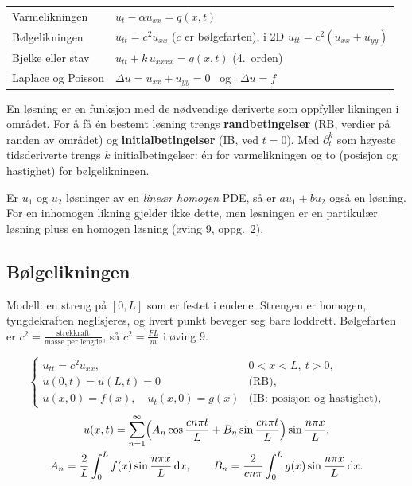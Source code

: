 \begin{defn}
\begin{tabular}{@{}ll@{}}
Varmelikningen & $u_t-\alpha u_{xx}=q(x,t)$\\
Bølgelikningen & $u_{tt}=c^2u_{xx}$ ($c$ er bølgefarten), i 2D $u_{tt}=c^2(u_{xx}+u_{yy})$\\
Bjelke eller stav & $u_{tt}+k\,u_{xxxx}=q(x,t)$ (4.\ orden)\\
Laplace og Poisson & $\Delta u=u_{xx}+u_{yy}=0$ \ og \ $\Delta u=f$
\end{tabular}
\end{defn}

\begin{defn}
En løsning er en funksjon med de nødvendige deriverte som oppfyller likningen i området. For å få én bestemt løsning trengs \textbf{randbetingelser} (RB, verdier på randen av området) og \textbf{initialbetingelser} (IB, ved $t=0$). Med $\partial_t^k$ som høyeste tidsderiverte trengs $k$ initialbetingelser: én for varmelikningen og to (posisjon og hastighet) for bølgelikningen.
\end{defn}
\begin{teorem}[superposisjonsprinsippet]
Er $u_1$ og $u_2$ løsninger av en \emph{lineær homogen} PDE, så er $au_1+bu_2$ også en løsning. For en inhomogen likning gjelder ikke dette, men løsningen er en partikulær løsning pluss en homogen løsning (øving 9, oppg.~2).
\end{teorem}

\subsection{Bølgelikningen}
Modell: en streng på $[0,L]$ som er festet i endene. Strengen er homogen, tyngdekraften neglisjeres, og hvert punkt beveger seg bare loddrett. Bølgefarten er $c^2=\frac{\text{strekkraft}}{\text{masse per lengde}}$, så $c^2=\frac{FL}m$ i øving 9.

\begin{formel}
\[
\begin{cases}
u_{tt}=c^2u_{xx}, & 0<x<L,\ t>0,\\
u(0,t)=u(L,t)=0 & \text{(RB)},\\
u(x,0)=f(x),\quad u_t(x,0)=g(x) & \text{(IB: posisjon og hastighet)},
\end{cases}
\]
\begin{gather*}
u(x,t)=\sum_{n=1}^\infty\Bigl(A_n\cos\frac{cn\pi t}{L}+B_n\sin\frac{cn\pi t}L\Bigr)\sin\frac{n\pi x}L,\\
A_n=\frac2L\int_0^Lf(x)\sin\frac{n\pi x}L\,\mathrm{d} x,\qquad B_n=\frac2{cn\pi}\int_0^Lg(x)\sin\frac{n\pi x}L\,\mathrm{d} x.
\end{gather*}
\end{formel}

